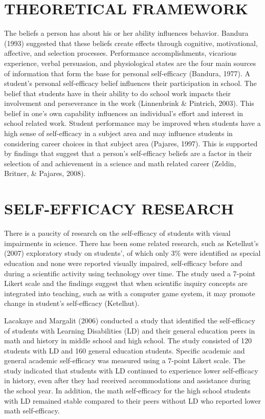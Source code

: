 \documentclass[11.5pt]{sig-alternate} %
\begin{document}
\begin{large}
\section*{THEORETICAL FRAMEWORK}

The beliefs a person has about his or her ability influences behavior.  Bandura (1993) suggested that these beliefs create effects through cognitive, motivational, affective, and selection processes. Performance accomplishments, vicarious experience, verbal persuasion, and physiological states are the four main sources of information that form the base for personal self-efficacy (Bandura, 1977). A student’s personal self-efficacy belief influences their participation in school. The belief that students have in their ability to do school work impacts their involvement and perseverance in the work (Linnenbrink \& Pintrich, 2003). This belief in one’s own capability influences an individual’s effort and interest in school related work. Student performance may be improved when students have a high sense of self-efficacy in a subject area and may influence students in considering career choices in that subject area (Pajares, 1997). This is supported by findings that suggest that a person’s self-efficacy beliefs are a factor in their selection of and achievement in a science and math related career (Zeldin, Britner, \& Pajares, 2008).

\section*{SELF-EFFICACY RESEARCH}

There is a paucity of research on the self-efficacy of students with visual impairments in science. There has been some related research, such as Ketelhut’s (2007) exploratory study on students’, of which only 3\% were identified as special education and none were reported visually impaired, self-efficacy before and during a scientific activity using technology over time. The study used a 7-point Likert scale and the findings suggest that when scientific inquiry concepts are integrated into teaching, such as with a computer game system, it may promote change in student’s self-efficacy (Ketelhut).

Lacakaye and Margalit (2006) conducted a study that identified the self-efficacy of students with Learning Disabilities (LD) and their general education peers in math and history in middle school and high school. The study consisted of 120 students with LD and 160 general education students. Specific academic and general academic self-efficacy was measured using a 7-point Likert scale. The study indicated that students with LD continued to experience lower self-efficacy in history, even after they had received accommodations and assistance during the school year. In addition, the math self-efficacy for the high school students with LD remained stable compared to their peers without LD who reported lower math self-efficacy.


\end{large}
\end{document}

